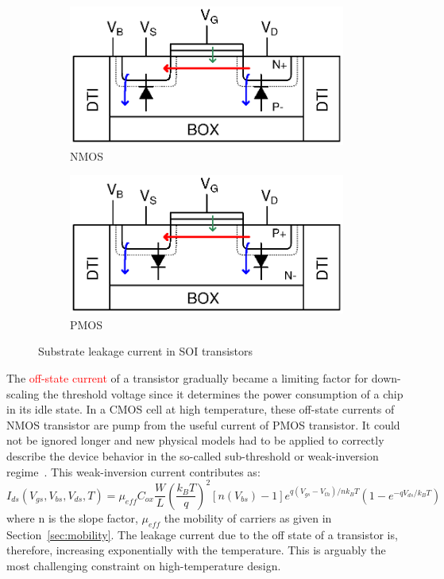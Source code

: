 \begin{figure}[htp]
	\centering
	\begin{subfigure}[b]{0.48\textwidth}
		\includegraphics[width=\textwidth]{Chapter2/Figs/Vector/soi-nmos-leakage.ps}
		\caption{NMOS}
	\end{subfigure}
	\begin{subfigure}[b]{0.48\textwidth}
		\includegraphics[width=\textwidth]{Chapter2/Figs/Vector/soi-pmos-leakage.ps}
		\caption{PMOS}
	\end{subfigure}
	\caption{Substrate leakage current in SOI transistors}
	\label{fig:soi-mos-leakage}
\end{figure}

The \textcolor{red}{off-state current} of a transistor gradually became a limiting factor for down-scaling the threshold voltage since it determines the power consumption of a chip in its idle state. In a CMOS cell at high temperature, these off-state currents of NMOS transistor are pump from the useful current of PMOS transistor. It could not be ignored longer and new physical models had to be applied to correctly describe the device behavior in the so-called sub-threshold or weak-inversion regime~\cite{Cheng21997,Enz1995,Joardar1998}. This weak-inversion current contributes as:
\begin{equation}
\label{eqn:ids_leakage}
I_{ds}(V_{gs}, V_{bs}, V_{ds}, T) = \mu_{eff} C_{ox} \frac{W}{L} {\left(\frac{k_B T}{q}\right)}^2 [n(V_{bs})-1] e^{q(V_{gs}-V_{th})/nk_B T} \left(1-e^{-qV_{ds}/k_B T} \right)
\end{equation}
where n is the slope factor, \(\mu_{eff} \) the mobility of carriers as given in Section~\ref{sec:mobility}. The leakage current due to the off state of a transistor is, therefore, increasing exponentially with the temperature. This is arguably the most challenging constraint on high-temperature design.

